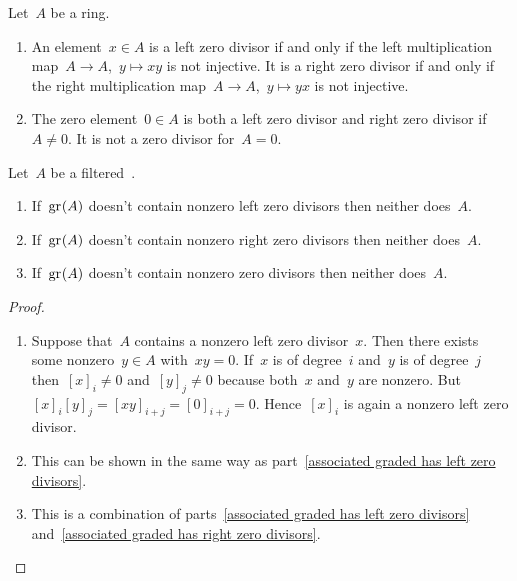 \begin{remark}
  Let~$A$ be a ring.
  \begin{enumerate}
    \item
      An element~$x \in A$ is a left zero divisor if and only if the left multiplication map~$A \to A$,~$y \mapsto xy$ is not injective.
      It is a right zero divisor if and only if the right multiplication map~$A \to A$,~$y \mapsto yx$ is not injective.
    \item
      The zero element~$0 \in A$ is both a left zero divisor and right zero divisor if~$A \neq 0$.
      It is not a zero divisor for~$A = 0$.
  \end{enumerate}
\end{remark}


\begin{proposition}
  \label{associated graded algebra and zero divisors}
  Let~$A$ be a filtered~{\algebra{$\kf$}}.
  \begin{enumerate}
    \item
      \label{associated graded has left zero divisors}
      If~$\gr(A)$ doesn’t contain nonzero left zero divisors then neither does~$A$.
    \item
      \label{associated graded has right zero divisors}
      If~$\gr(A)$ doesn’t contain nonzero right zero divisors then neither does~$A$.
    \item
      If~$\gr(A)$ doesn’t contain nonzero zero divisors then neither does~$A$.
  \end{enumerate}
\end{proposition}


\begin{proof}
  \leavevmode
  \begin{enumerate}
    \item
      Suppose that~$A$ contains a nonzero left zero divisor~$x$.
      Then there exists some nonzero~$y \in A$ with~$xy = 0$.
      If~$x$ is of degree~$i$ and~$y$ is of degree~$j$ then~$[x]_i \neq 0$ and~$[y]_j \neq 0$ because both~$x$ and~$y$ are nonzero.
      But~$[x]_i [y]_j = [xy]_{i+j} = [0]_{i+j} = 0$.
      Hence~$[x]_i$ is again a nonzero left zero divisor.
    \item
      This can be shown in the same way as part~\ref*{associated graded has left zero divisors}.
    \item
      This is a combination of parts~\ref*{associated graded has left zero divisors} and~\ref*{associated graded has right zero divisors}.
    \qedhere
  \end{enumerate}
\end{proof}


